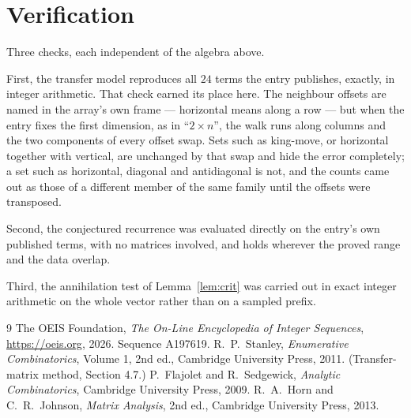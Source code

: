 \documentclass[11pt,a4paper]{article}
\theoremstyle{plain}
\theoremstyle{definition}
\begin{document}
\section{Verification}

Three checks, each independent of the algebra above.

First, the transfer model reproduces all $24$ terms the entry publishes, exactly, in
integer arithmetic. That check earned its place here. The neighbour offsets are named in the
array's own frame --- horizontal means along a row --- but when the entry fixes the first
dimension, as in ``$2\times n$'', the walk runs along columns and the two components of every
offset swap. Sets such as king-move, or horizontal together with vertical, are unchanged by
that swap and hide the error completely; a set such as horizontal, diagonal and antidiagonal
is not, and the counts came out as those of a different member of the same family until the
offsets were transposed.

Second, the conjectured recurrence was evaluated directly on the entry's own published terms,
with no matrices involved, and holds wherever the proved range and the data overlap.

Third, the annihilation test of Lemma~\ref{lem:crit} was carried out in exact integer
arithmetic on the whole vector rather than on a sampled prefix.

\begin{thebibliography}{9}
 The OEIS Foundation, \emph{The On-Line Encyclopedia of Integer
Sequences}, \url{https://oeis.org}, 2026. Sequence A197619.
 R.~P.~Stanley, \emph{Enumerative Combinatorics}, Volume 1, 2nd ed.,
Cambridge University Press, 2011. (Transfer-matrix method, Section 4.7.)
 P.~Flajolet and R.~Sedgewick, \emph{Analytic Combinatorics}, Cambridge
University Press, 2009.
 R.~A.~Horn and C.~R.~Johnson, \emph{Matrix Analysis}, 2nd ed., Cambridge
University Press, 2013.
\end{thebibliography}
\end{document}
